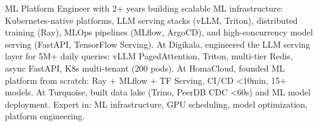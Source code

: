 \small{ML Platform Engineer with 2+ years building scalable ML infrastructure: Kubernetes-native platforms, LLM serving stacks (vLLM, Triton), distributed training (Ray), MLOps pipelines (MLflow, ArgoCD), and high-concurrency model serving (FastAPI, TensorFlow Serving). At Digikala, engineered the LLM serving layer for 5M+ daily queries: vLLM PagedAttention, Triton, multi-tier Redis, async FastAPI, K8s multi-tenant (200 pods). At HomaCloud, founded ML platform from scratch: Ray + MLflow + TF Serving, CI/CD <10min, 15+ models. At Turquoise, built data lake (Trino, PeerDB CDC <60s) and ML model deployment. Expert in: ML infrastructure, GPU scheduling, model optimization, platform engineering.}\vspace{3pt}